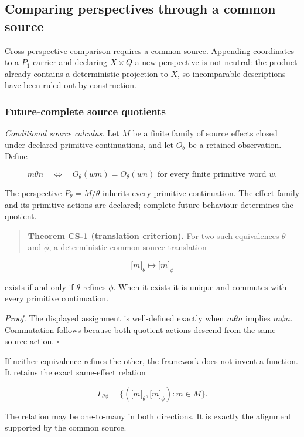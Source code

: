 \documentclass[11pt,a4paper]{article}
\begin{document}
\subsection{Comparing perspectives through a common
source}

Cross-perspective comparison requires a common source. Appending
coordinates to a \(P_{1}\) carrier and declaring \(X \times Q\) a new
perspective is not neutral: the product already contains a deterministic
projection to \(X\), so incomparable descriptions have been ruled out by
construction.

\subsubsection{Future-complete source
quotients}

\emph{Conditional source calculus.} Let \(M\) be a finite family of
source effects closed under declared primitive continuations, and let
\(O_{\theta}\) be a retained observation. Define

\[m\theta n\quad \Leftrightarrow \quad O_{\theta}(wm) = O_{\theta}(wn)\text{ for every finite primitive word }w.\]

The perspective \(P_{\theta} = M/\theta\) inherits every primitive
continuation. The effect family and its primitive actions are declared;
complete future behaviour determines the quotient.

\begin{quote}
\textbf{Theorem CS-1 (translation criterion).} For two such equivalences
\(\theta\) and \(\phi\), a deterministic common-source translation
\end{quote}

\[\lbrack m\rbrack_{\theta} \mapsto \lbrack m\rbrack_{\phi}\]

exists if and only if \(\theta\) refines \(\phi\). When it exists it is
unique and commutes with every primitive continuation.

\emph{Proof.} The displayed assignment is well-defined exactly when
\(m\theta n\) implies \(m\phi n\). Commutation follows because both
quotient actions descend from the same source action. \(\ensuremath{\square}\)

If neither equivalence refines the other, the framework does not invent
a function. It retains the exact same-effect relation

\[\Gamma_{\theta\phi} = \{\left( \lbrack m\rbrack_{\theta},\lbrack m\rbrack_{\phi} \right):m \in M\}.\]

The relation may be one-to-many in both directions. It is exactly the
alignment supported by the common source.
\end{document}
